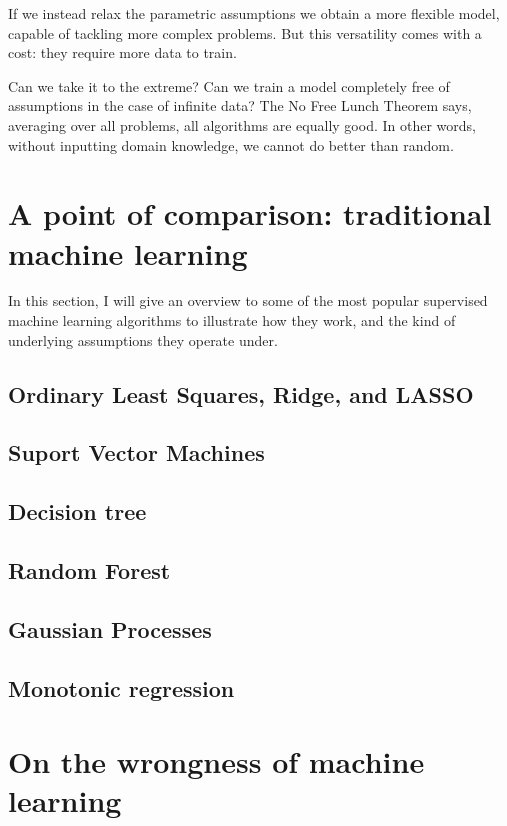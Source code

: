 If we instead relax the parametric assumptions we obtain a more flexible model, capable of tackling more complex problems.
But this versatility comes with a cost: they require more data to train.

\begin{center}
\end{center}


Can we take it to the extreme?
Can we train a model completely free  of assumptions in the case of infinite data? The No Free Lunch Theorem \citep{no_free_lunch} says, averaging over all problems, all algorithms are equally good.
In other words, without inputting domain knowledge, we cannot do better than random.

\section[Traditional machine learning]{A point of comparison: traditional machine learning}
In this section, I will give an overview to some of the most popular supervised machine learning algorithms to illustrate how they work, and the kind of underlying assumptions they operate under.

\subsection{Ordinary Least Squares, Ridge, and LASSO}
\subsection{Suport Vector Machines}
\subsection{Decision tree}
\subsection{Random Forest}
\subsection{Gaussian Processes}
\subsection{Monotonic regression}

\section{On the wrongness of machine learning}\label{sec:wrong}
